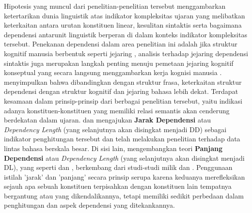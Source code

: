 Hipotesis yang muncul dari penelitian-penelitian tersebut menggambarkan ketertarikan dunia linguistik atas indikator kompleksitas ujaran yang melibatkan keterkaitan antara urutan konstituen linear, kesulitan sintaktis serta bagaimana dependensi antarunit linguistik berperan di dalam konteks indikator kompleksitas tersebut. Penekanan dependensi dalam area penelitian ini adalah jika struktur kognitif manusia berbentuk seperti jejaring \citep{hudson2007language}, analisis terhadap jejaring dependensi sintaktis juga merupakan langkah penting menuju pemetaan jejaring kognitif konseptual yang secara langsung menggambarkan kerja kognisi manusia \citep{liu2008dependency}. \cite{liu2008dependency} menyimpulkan bahwa dibandingkan dengan struktur frasa, keterkaitan struktur dependensi dengan struktur kognitif dan jejaring bahasa lebih dekat. Terdapat kesamaan dalam prinsip-prinsip dari berbagai penelitian tersebut, yaitu indikasi adanya konstituen-konstituen yang memiliki relasi semantis akan cenderung berdekatan dalam ujaran. \cite{liu2008dependency} dan \cite{liu2017dependency} mengajukan \textbf{Jarak Dependensi} atau \textit{Dependency Length} (yang selanjutnya akan disingkat menjadi DD) sebagai indikator penghitungan tersebut dan telah melakukan penelitian terhadap data lintas bahasa berskala besar. Di sisi lain, \cite{gildea2010grammars} mengembangkan teori \textbf{Panjang Dependensi} atau \textit{Dependency Length} (yang selanjutnya akan disingkat menjadi DL), yang seperti \cite{liu2008dependency} dan \cite{liu2017dependency}, berkembang dari studi-studi milik \citealp{gibson1998linguistic, gibson2000dependency} dan \cite{hawkins1994performance}. Penggunaan istilah 'jarak' dan 'panjang' secara prinsip serupa karena keduanya merefleksikan sejauh apa sebuah konstituen terpisahkan dengan konstituen lain tempatnya bergantung atau yang dikendalikannya, tetapi memiliki sedikit perbedaan dalam penghitungan dan aspek dependensi yang ditekankannya. 

